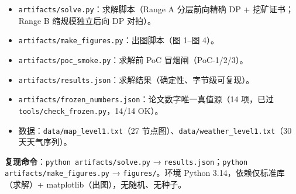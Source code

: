 \documentclass[12pt,a4paper]{ctexart}
\begin{document}
\begin{itemize}
  \item \texttt{artifacts/solve.py}：求解脚本（Range A 分层前向精确 DP + 挖矿证书；Range B 缩规模独立后向 DP 对拍）。
  \item \texttt{artifacts/make\_figures.py}：出图脚本（图 1--图 4）。
  \item \texttt{artifacts/poc\_smoke.py}：求解前 PoC 冒烟闸（PoC-1/2/3）。
  \item \texttt{artifacts/results.json}：求解结果（确定性、字节级可复现）。
  \item \texttt{artifacts/frozen\_numbers.json}：论文数字唯一真值源（14 项，已过 \texttt{tools/check\_frozen.py}，14/14 OK）。
  \item 数据：\texttt{data/map\_level1.txt}（27 节点图）、\texttt{data/weather\_level1.txt}（30 天天气序列）。
\end{itemize}

\noindent\textbf{复现命令}：\texttt{python artifacts/solve.py} → \texttt{results.json}；\texttt{python artifacts/make\_figures.py} → \texttt{figures/}。环境 Python 3.14，依赖仅标准库（求解）+ matplotlib（出图），无随机、无种子。
\end{document}
